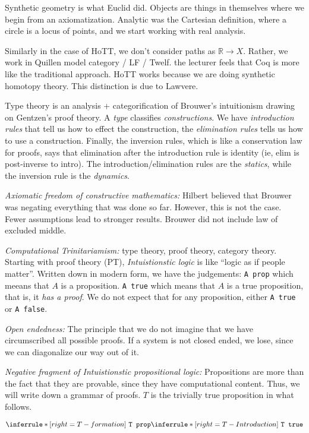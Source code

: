 \documentclass[11pt]{book}
\newcommand{\R}{\ensuremath{\mathbb R}}
\begin{document}
Synthetic geometry is what Euclid did. Objects are things in themselves where
we begin from an axiomatization.  Analytic was the Cartesian definition, where
a circle is a locus of points, and we start working with real analysis. 

Similarly in the case of HoTT, we don't consider paths as $\R \rightarrow X$.
Rather, we work in Quillen model category / LF / Twelf. the lecturer feels that
Coq is more like the traditional approach. HoTT works because we are doing
synthetic homotopy theory. This distinction is due to Lawvere.

Type theory is an analysis + categorification of Brouwer's intuitionism drawing
on Gentzen's proof theory. A \emph{type} classifies \emph{constructions}.  We
have \emph{introduction rules} that tell us how to effect the construction, the
\emph{elimination rules} tells us how to use a construction. Finally, the
inversion rules, which is like a conservation law for proofs, says that
elimination after the introduction rule is identity (ie, elim is post-inverse
to intro). The introduction/elimination rules are the \emph{statics}, while the
inversion rule is the \emph{dynamics}.

\emph{Axiomatic freedom of constructive mathematics:} Hilbert believed that
Brouwer was negating everything that was done so far. However, this is not the
case. Fewer assumptions lead to stronger results. Brouwer did not include law
of excluded middle.

\emph{Computational Trinitariamism:} type theory, proof theory, category
theory.  Starting with proof theory (PT), \emph{Intuistionstic logic} is like
``logic as if people matter''. Written down in modern form, we have the judgements:
\texttt{A prop} which meeans that $A$ is a proposition. \texttt{A true} which means
that $A$ is a true proposition, that is, it \emph{has a proof}. We do not expect
that for any proposition, either \texttt{A true} or \texttt{A false}.

\emph{Open endedness:} The principle that we do not imagine that we have
circumscribed all possible proofs. If a system is not closed ended, we lose,
since we can diagonalize our way out of it.

\emph{Negative fragment of Intuistionstic propositional logic:} Propositions
are more than the fact that they are provable, since they have computational content.
Thus, we will write down a grammar of proofs. $T$ is the trivially true proposition
in what follows. 

$$
\inferrule*[right=T-formation]{~}{\texttt{T prop}}
\inferrule*[right=T-Introduction]{~}{\texttt{T true}}
$$
\end{document}
